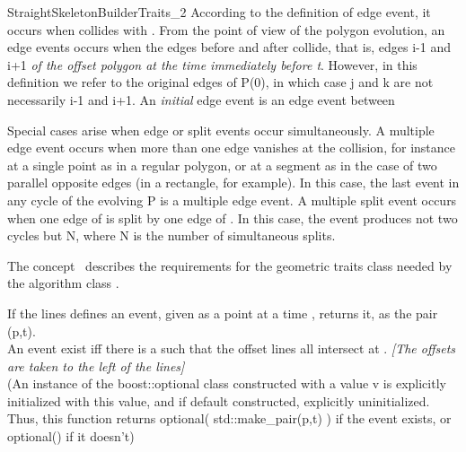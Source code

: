 \begin{ccRefConcept}{StraightSkeletonBuilderTraits_2}
According to the definition of edge event, it occurs when  collides with . From the point of view of the polygon evolution, an edge events occurs when the edges before and after  collide, that is, edges i-1 and i+1 \textit{of the offset polygon at the time immediately before t}. However, in this definition we refer to the original edges of P(0), in which case j and k are not necessarily i-1 and i+1. An \textit{initial} edge event is an edge event between 

Special cases arise when edge or split events occur simultaneously. A multiple edge event occurs when more than one edge vanishes at the collision, for instance at a single point as in a regular polygon, or at a segment as in the case of two parallel opposite edges (in a rectangle, for example). In this case, the last event in any cycle of the evolving P is a multiple edge event. A multiple split event occurs when one edge of  is split by one edge of . In this case, the event produces not two cycles but N, where N is the number of simultaneous splits.


\ccDefinition

The concept \ccRefName\ describes the requirements for the geometric traits class needed by the algorithm class .

\ccTypes
  \ccGlue
  \ccGlue


  {If the lines  defines an event, given as a point  at a time , returns it, as the pair (p,t).\\
  An event exist iff there is a  such that the offset lines
   all intersect at . \textit{[The offsets are taken to the left of the lines]}\\
  (An instance of the boost::optional class constructed with a value v is explicitly initialized with this value, and if default constructed, explicitly uninitialized. Thus, this function returns optional( std::make\_pair(p,t) ) if the event exists, or optional() if it doesn't)}


\end{ccRefConcept}
